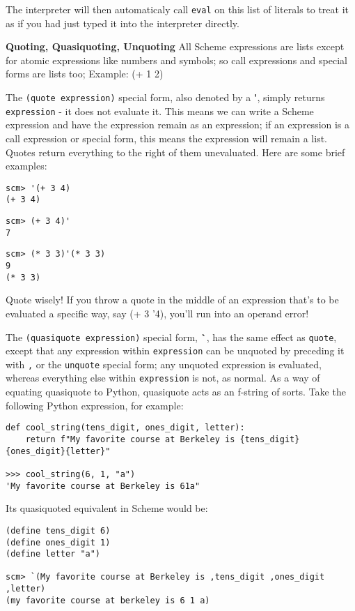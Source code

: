 The interpreter will then automaticaly call \texttt{eval} on this list of literals to treat it as if you had just typed it into the interpreter directly. 

\newpage
\textbf{Quoting, Quasiquoting, Unquoting} All Scheme expressions are lists except for atomic expressions like numbers and symbols; so call expressions and special forms are lists too; Example: (+ 1 2)

The \texttt{(quote expression)} special form, also denoted by a \textbf{\'}, simply returns \texttt{expression} - it does not evaluate it. 
This means we can write a Scheme expression and have the expression remain as an expression; if an expression is a call expression or special form, this means the expression will remain a list. 
Quotes return everything to the right of them unevaluated. Here are some brief examples:

\begin{lstlisting}
scm> '(+ 3 4)
(+ 3 4)
\end{lstlisting}
\begin{lstlisting}
scm> (+ 3 4)'
7
\end{lstlisting}
\begin{lstlisting}
scm> (* 3 3)'(* 3 3)
9
(* 3 3)
\end{lstlisting}
Quote wisely! If you throw a quote in the middle of an expression that's to be evaluated a specific way, say (+ 3 '4), you'll run into an operand error!

The \texttt{(quasiquote expression)} special form, \textbf{\`}, has the same effect as \texttt{quote}, except that any expression within \texttt{expression} can be unquoted by preceding it with \texttt{,} or the \texttt{unquote} special form; any unquoted expression is evaluated, whereas everything else within \texttt{expression} is not, as normal. 
As a way of equating quasiquote to Python, quasiquote acts as an f-string of sorts. Take the following Python expression, for example:

\begin{lstlisting}
def cool_string(tens_digit, ones_digit, letter):
    return f"My favorite course at Berkeley is {tens_digit}{ones_digit}{letter}"

>>> cool_string(6, 1, "a")
'My favorite course at Berkeley is 61a"
\end{lstlisting}

Its quasiquoted equivalent in Scheme would be:

\begin{lstlisting}
(define tens_digit 6)
(define ones_digit 1)
(define letter "a")

scm> `(My favorite course at Berkeley is ,tens_digit ,ones_digit ,letter)
(my favorite course at berkeley is 6 1 a)
\end{lstlisting}

